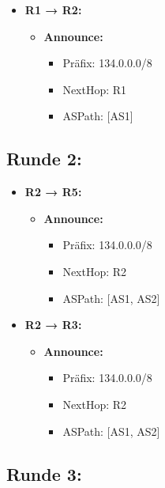 \documentclass[a4paper]{scrartcl}
\begin{document}
\begin{itemize}
    \item \textbf{R1 → R2:}
    \begin{itemize}
        \item \textbf{Announce:}
        \begin{itemize}
            \item Präfix: 134.0.0.0/8
            \item NextHop: R1
            \item ASPath: [AS1]
        \end{itemize}
    \end{itemize}
\end{itemize}

\subsection*{Runde 2:}

\begin{itemize}
    \item \textbf{R2 → R5:}
    \begin{itemize}
        \item \textbf{Announce:}
        \begin{itemize}
            \item Präfix: 134.0.0.0/8
            \item NextHop: R2
            \item ASPath: [AS1, AS2]
        \end{itemize}
    \end{itemize}
    \item \textbf{R2 → R3:}
    \begin{itemize}
        \item \textbf{Announce:}
        \begin{itemize}
            \item Präfix: 134.0.0.0/8
            \item NextHop: R2
            \item ASPath: [AS1, AS2]
        \end{itemize}
    \end{itemize}
\end{itemize}

\subsection*{Runde 3:}
\end{document}

